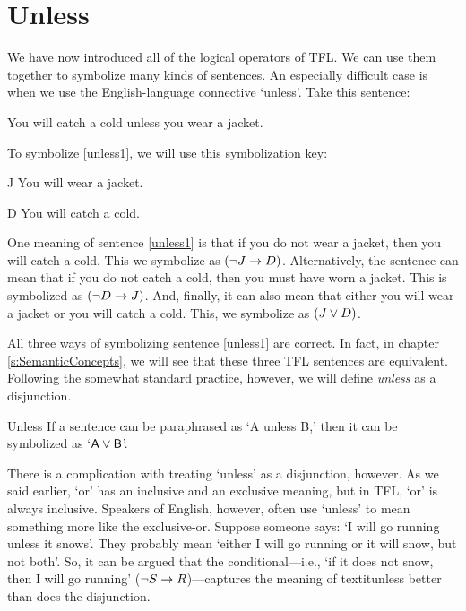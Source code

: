 \section{Unless}\label{s:unless}
We have now introduced all of the logical operators of TFL. We can use them together to symbolize many kinds of sentences. An especially difficult case is when we use the English-language connective `unless'. Take this sentence:

\begin{earg}
\item[\ex{unless1}] You will catch a cold unless you wear a jacket. 
\end{earg}
To symbolize \ref{unless1}, we will use this symbolization key:
	\begin{ekey}
		\item[J] You will wear a jacket.
		\item[D] You will catch a cold.
	\end{ekey}

One meaning of sentence \ref{unless1} is that if you do not wear a jacket, then you will catch a cold. This we symbolize as $({\neg} J \rightarrow D)$. Alternatively, the sentence can mean that if you do not catch a cold, then you must have worn a jacket. This is symbolized as $({\neg} D \rightarrow J)$. And, finally, it can also mean that either you will wear a jacket or you will catch a cold. This, we symbolize as $(J \vee D)$.

All three ways of symbolizing sentence \ref{unless1} are correct. In fact, in chapter \ref{s:SemanticConcepts}, we will see that these three TFL sentences are equivalent. Following the somewhat standard practice, however, we will define \textit{unless} as a disjunction.
	
\begin{factboxy}{Unless}
If a sentence can be paraphrased as `A unless B,' then it can be symbolized as `$\mathsf{A}\vee\mathsf{B}$'.
\end{factboxy}

There is a complication with treating `unless' as a disjunction, however. As we said earlier, `or' has an inclusive and an exclusive meaning, but in TFL, `or' is always inclusive. Speakers of English, however, often use `unless' to mean something more like the exclusive-or. Suppose someone says: `I will go running unless it snows'. They probably mean `either I will go running or it will snow, but not both'. So, it can be argued that the conditional---i.e., `if it does not snow, then I will go running' (${\neg} S \rightarrow R$)---captures the meaning of textit{unless} better than does the disjunction.


